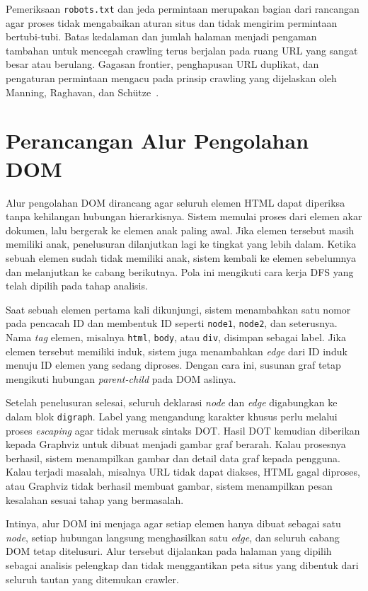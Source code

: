 Pemeriksaan \texttt{robots.txt} dan jeda permintaan merupakan bagian dari rancangan agar proses tidak mengabaikan aturan situs dan tidak mengirim permintaan bertubi-tubi. Batas kedalaman dan jumlah halaman menjadi pengaman tambahan untuk mencegah crawling terus berjalan pada ruang URL yang sangat besar atau berulang. Gagasan frontier, penghapusan URL duplikat, dan pengaturan permintaan mengacu pada prinsip crawling yang dijelaskan oleh Manning, Raghavan, dan Schütze~\cite{manning:08:introir}.

\section{Perancangan Alur Pengolahan DOM}
\label{sec:perancangan-alur-pengolahan-dom}

Alur pengolahan DOM dirancang agar seluruh elemen HTML dapat diperiksa tanpa kehilangan hubungan hierarkisnya. Sistem memulai proses dari elemen akar dokumen, lalu bergerak ke elemen anak paling awal. Jika elemen tersebut masih memiliki anak, penelusuran dilanjutkan lagi ke tingkat yang lebih dalam. Ketika sebuah elemen sudah tidak memiliki anak, sistem kembali ke elemen sebelumnya dan melanjutkan ke cabang berikutnya. Pola ini mengikuti cara kerja DFS yang telah dipilih pada tahap analisis.

Saat sebuah elemen pertama kali dikunjungi, sistem menambahkan satu nomor pada pencacah ID dan membentuk ID seperti \texttt{node1}, \texttt{node2}, dan seterusnya. Nama \textit{tag} elemen, misalnya \texttt{html}, \texttt{body}, atau \texttt{div}, disimpan sebagai label. Jika elemen tersebut memiliki induk, sistem juga menambahkan \textit{edge} dari ID induk menuju ID elemen yang sedang diproses. Dengan cara ini, susunan graf tetap mengikuti hubungan \textit{parent-child} pada DOM aslinya.

Setelah penelusuran selesai, seluruh deklarasi \textit{node} dan \textit{edge} digabungkan ke dalam blok \texttt{digraph}. Label yang mengandung karakter khusus perlu melalui proses \textit{escaping} agar tidak merusak sintaks DOT. Hasil DOT kemudian diberikan kepada Graphviz untuk dibuat menjadi gambar graf berarah. Kalau prosesnya berhasil, sistem menampilkan gambar dan detail data graf kepada pengguna. Kalau terjadi masalah, misalnya URL tidak dapat diakses, HTML gagal diproses, atau Graphviz tidak berhasil membuat gambar, sistem menampilkan pesan kesalahan sesuai tahap yang bermasalah.

Intinya, alur DOM ini menjaga agar setiap elemen hanya dibuat sebagai satu \textit{node}, setiap hubungan langsung menghasilkan satu \textit{edge}, dan seluruh cabang DOM tetap ditelusuri. Alur tersebut dijalankan pada halaman yang dipilih sebagai analisis pelengkap dan tidak menggantikan peta situs yang dibentuk dari seluruh tautan yang ditemukan crawler.

